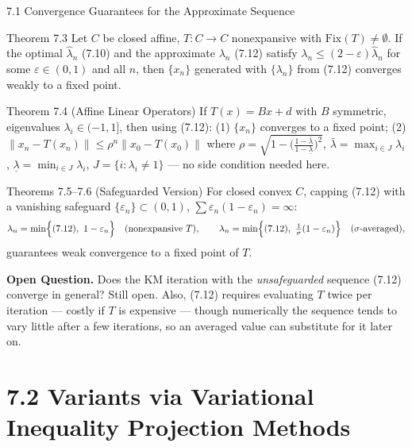 \documentclass[aspectratio=169,10pt]{beamer}
\newcommand{\norm}[1]{\left\|#1\right\|}
\newcommand{\Fix}{\mathrm{Fix}}
\begin{document}
\begin{frame}{7.1 Convergence Guarantees for the Approximate Sequence}

  \begin{alertblock}{Theorem 7.3}
    Let $C$ be closed affine, $T:C\to C$ nonexpansive with
    $\Fix(T)\neq\emptyset$. If the optimal $\widehat\lambda_n$ (7.10)
    and the approximate $\lambda_n$ (7.12) satisfy
    $\lambda_n\le(2-\varepsilon)\widehat\lambda_n$ for some
    $\varepsilon\in(0,1)$ and all $n$, then $\{x_n\}$ generated with
    $\{\lambda_n\}$ from (7.12) converges weakly to a fixed point.
  \end{alertblock}

  \begin{alertblock}{Theorem 7.4 (Affine Linear Operators)}
    If $T(x)=Bx+d$ with $B$ symmetric, eigenvalues
    $\lambda_i\in(-1,1]$, then using (7.12): (1) $\{x_n\}$ converges
    to a fixed point; (2) $\norm{x_n-T(x_n)}\le\rho^n\norm{x_0-T(x_0)}$
    where $\rho=\sqrt{1-\bigl(\tfrac{1-\bar\lambda}{1-\underline\lambda}\bigr)^2}$,
    $\bar\lambda=\max_{i\in J}\lambda_i$, $\underline\lambda=\min_{i\in J}\lambda_i$,
    $J=\{i:\lambda_i\neq1\}$ --- no side condition needed here.
  \end{alertblock}

  \begin{block}{Theorems 7.5--7.6 (Safeguarded Version)}
    For closed convex $C$, capping (7.12) with a vanishing safeguard
    $\{\varepsilon_n\}\subset(0,1)$, $\sum\varepsilon_n(1-\varepsilon_n)=\infty$:
    \[
      \lambda_n=\min\Bigl\{\text{(7.12)},\ 1-\varepsilon_n\Bigr\}
      \quad\text{(nonexpansive } T),\qquad
      \lambda_n=\min\Bigl\{\text{(7.12)},\ \tfrac1\sigma(1-\varepsilon_n)\Bigr\}
      \quad(\sigma\text{-averaged}),
    \]
    guarantees weak convergence to a fixed point of $T$.
  \end{block}

  \textbf{Open Question.} Does the KM iteration with the
  \emph{unsafeguarded} sequence (7.12) converge in general? Still
  open. Also, (7.12) requires evaluating $T$ twice per iteration ---
  costly if $T$ is expensive --- though numerically the sequence
  tends to vary little after a few iterations, so an averaged value
  can substitute for it later on.

\end{frame}

\section{7.2 Variants via Variational Inequality Projection Methods}
\end{document}
